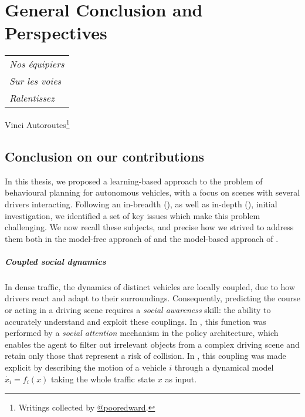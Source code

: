 
\makeatletter
\def\toclevel@chapter{-1}
\makeatother

\chapter{General Conclusion and Perspectives}
\label{chapter:conclusion}

\begin{flushright}
	\begin{tabular}{@{}l@{}}
		\emph{Nos équipiers}\\
		\emph{\hspace*{1.0cm}Sur les voies}\\
		\emph{\hspace*{0.5cm}Ralentissez}\\
	\end{tabular}

	Vinci Autoroutes\footnote{Writings collected by \href{https://twitter.com/pooredward/status/1273249408231124994}
		{@pooredward}.}\hspace*{1cm}
\end{flushright}

\section{Conclusion on our contributions}
In this thesis, we proposed a learning-based approach to the problem of behavioural planning for autonomous vehicles, with a focus on scenes with several drivers interacting. Following an in-breadth (), as well as in-depth (), initial investigation, we identified a set of key issues which make this problem challenging. We now recall these subjects, and precise how we strived to address them both in the model-free approach of  and the model-based approach of .


\paragraph{Coupled social dynamics}
In dense traffic, the dynamics of distinct vehicles are locally coupled, due to how drivers react and adapt to their surroundings. Consequently, predicting the course or acting in a driving scene requires a \emph{social awareness} skill: the ability to accurately understand and exploit these couplings.
In , this function was performed by a \emph{social attention} mechanism in the policy architecture, which enables the agent to filter out irrelevant objects from a complex driving scene and retain only those that represent a risk of collision. In , this coupling was made explicit by describing the motion of a vehicle $i$ through a dynamical model $\dot{x_i} = f_i(x)$ taking the whole traffic state $x$ as input.

